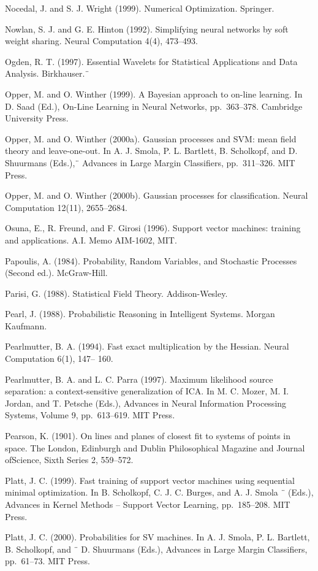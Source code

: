 \documentclass[
  10
]{article}
\begin{document}
Nocedal, J. and S. J. Wright (1999). Numerical Optimization. Springer.

Nowlan, S. J. and G. E. Hinton (1992). Simplifying neural networks by
soft weight sharing. Neural Computation 4(4), 473--493.

Ogden, R. T. (1997). Essential Wavelets for Statistical Applications and
Data Analysis. Birkhauser.¨

Opper, M. and O. Winther (1999). A Bayesian approach to on-line
learning. In D. Saad (Ed.), On-Line Learning in Neural Networks,
pp.~363--378. Cambridge University Press.

Opper, M. and O. Winther (2000a). Gaussian processes and SVM: mean field
theory and leave-one-out. In A. J. Smola, P. L. Bartlett, B. Scholkopf,
and D. Shuurmans (Eds.),¨ Advances in Large Margin Classifiers,
pp.~311--326. MIT Press.

Opper, M. and O. Winther (2000b). Gaussian processes for classification.
Neural Computation 12(11), 2655--2684.

Osuna, E., R. Freund, and F. Girosi (1996). Support vector machines:
training and applications. A.I. Memo AIM-1602, MIT.

Papoulis, A. (1984). Probability, Random Variables, and Stochastic
Processes (Second ed.). McGraw-Hill.

Parisi, G. (1988). Statistical Field Theory. Addison-Wesley.

Pearl, J. (1988). Probabilistic Reasoning in Intelligent Systems. Morgan
Kaufmann.

Pearlmutter, B. A. (1994). Fast exact multiplication by the Hessian.
Neural Computation 6(1), 147-- 160.

Pearlmutter, B. A. and L. C. Parra (1997). Maximum likelihood source
separation: a context-sensitive generalization of ICA. In M. C. Mozer,
M. I. Jordan, and T. Petsche (Eds.), Advances in Neural Information
Processing Systems, Volume 9, pp.~613--619. MIT Press.

Pearson, K. (1901). On lines and planes of closest fit to systems of
points in space. The London, Edinburgh and Dublin Philosophical Magazine
and Journal ofScience, Sixth Series 2, 559--572.

Platt, J. C. (1999). Fast training of support vector machines using
sequential minimal optimization. In B. Scholkopf, C. J. C. Burges, and
A. J. Smola ¨ (Eds.), Advances in Kernel Methods -- Support Vector
Learning, pp.~185--208. MIT Press.

Platt, J. C. (2000). Probabilities for SV machines. In A. J. Smola, P.
L. Bartlett, B. Scholkopf, and ¨ D. Shuurmans (Eds.), Advances in Large
Margin Classifiers, pp.~61--73. MIT Press.
\end{document}
